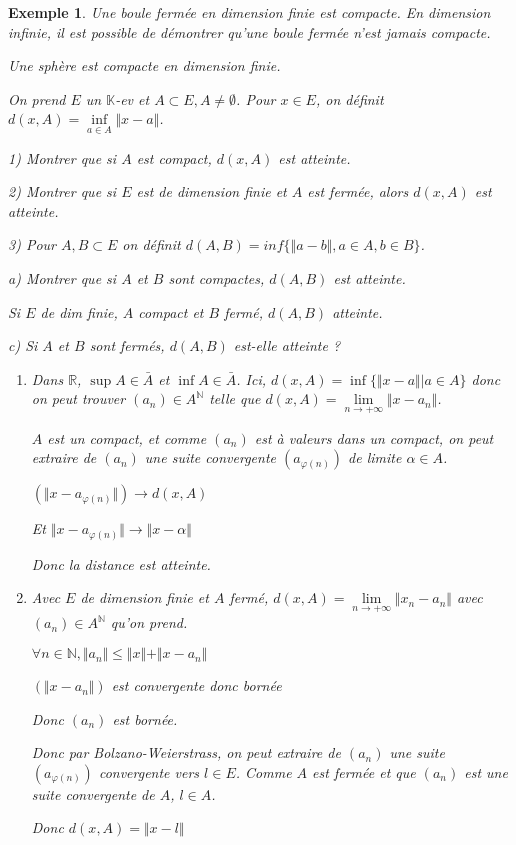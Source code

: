 \documentclass[a4paper,12pt]{book}
\newtheorem{Exe}{Exemple}[section]
\def\R{\mathbb{R}}
\def\N{\mathbb{N}}
\def\K{\mathbb{K}}
\begin{document}
\begin{Exe}
Une boule fermée en dimension finie est compacte. En dimension infinie, il est possible de démontrer qu'une boule fermée n'est jamais compacte. \par Une sphère est compacte en dimension finie.
\par On prend $E$ un $\K$-ev et $A\subset E, A\neq\emptyset$. Pour $x\in E$, on définit $d(x,A)=\inf\limits_{a\in A}\Vert x-a\Vert$. \par 1) Montrer que si $A$ est compact, $d(x, A)$ est atteinte. \par 2) Montrer que si $E$ est de dimension finie et $A$ est fermée, alors $d(x, A)$ est atteinte. \par 3) Pour $A,B\subset E$ on définit $d(A,B)=inf\{\Vert a-b\Vert, a\in A, b\in B\}$. \par a) Montrer que si $A$ et $B$ sont compactes, $d(A,B)$ est atteinte. \par Si $E$ de dim finie, $A$ compact et $B$ fermé, $d(A,B)$ atteinte. \par c) Si $A$ et $B$ sont fermés, $d(A, B)$ est-elle atteinte ?
\begin{enumerate}
\item Dans $\R$, $\sup A\in\bar A$ et $\inf A\in\bar{A}$. Ici, $d(x,A)=\inf\{\Vert x-a\Vert \vert a\in A\}$ donc on peut trouver $(a_n)\in A^\N$ telle que $d(x,A)=\lim\limits_{n\to+\infty}\Vert x-a_n\Vert$. \par $A$ est un compact, et comme $(a_n)$ est à valeurs dans un compact, on peut extraire de $(a_n)$ une suite convergente $(a_{\varphi(n)})$ de limite $\alpha\in A$. \par $(\Vert x-a_{\varphi(n)}\Vert)\to d(x,A)$ \par Et $\Vert x-a_{\varphi(n)}\Vert \to \Vert x-\alpha\Vert$ \par Donc la distance est atteinte. 
\item Avec $E$ de dimension finie et $A$ fermé, $d(x,A)=\lim\limits_{n\to+\infty}\Vert x_n-a_n\Vert$ avec $(a_n)\in A^\N$ qu'on prend. \par $\forall n\in\N,\Vert a_n\Vert\leq \Vert x\Vert + \Vert x-a_n\Vert$ \par $(\Vert x-a_n\Vert)$ est convergente donc bornée \par Donc $(a_n)$ est bornée. \par Donc par Bolzano-Weierstrass, on peut extraire de $(a_n)$ une suite $(a_{\varphi(n)})$ convergente vers $l\in E$. Comme $A$ est fermée et que $(a_n)$ est une suite convergente de $A$, $l\in A$. \par Donc $d(x,A)=\Vert x-l\Vert$

\end{enumerate}
\end{Exe}
\end{document}
